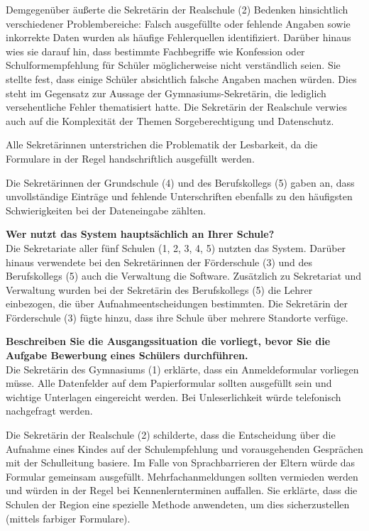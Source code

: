 Demgegenüber äußerte die Sekretärin der Realschule (2) Bedenken hinsichtlich verschiedener Problembereiche: Falsch ausgefüllte oder fehlende Angaben sowie inkorrekte Daten wurden als häufige Fehlerquellen identifiziert. Darüber hinaus wies sie darauf hin, dass bestimmte Fachbegriffe wie \glqq Konfession\grqq{} oder \glqq Schulformempfehlung\grqq{} für Schüler möglicherweise nicht verständlich seien. Sie stellte fest, dass einige Schüler absichtlich falsche Angaben machen würden. Dies steht im Gegensatz zur Aussage der Gymnasiums-Sekretärin, die lediglich versehentliche Fehler thematisiert hatte. Die Sekretärin der Realschule verwies auch auf die Komplexität der Themen Sorgeberechtigung und Datenschutz.

Alle Sekretärinnen unterstrichen die Problematik der Lesbarkeit, da die Formulare in der Regel handschriftlich ausgefüllt werden.

Die Sekretärinnen der Grundschule (4) und des Berufskollegs (5) gaben an, dass unvollständige Einträge und fehlende Unterschriften ebenfalls zu den häufigsten Schwierigkeiten bei der Dateneingabe zählten.


\textbf{Wer nutzt das System hauptsächlich an Ihrer Schule?}\\
Die Sekretariate aller fünf Schulen (1, 2, 3, 4, 5) nutzten das System. Darüber hinaus verwendete bei den Sekretärinnen der Förderschule (3) und des Berufskollegs (5) auch die Verwaltung die Software. Zusätzlich zu Sekretariat und Verwaltung wurden bei der Sekretärin des Berufskollegs (5) die Lehrer einbezogen, die über Aufnahmeentscheidungen bestimmten. Die Sekretärin der Förderschule (3) fügte hinzu, dass ihre Schule über mehrere Standorte verfüge.


\textbf{Beschreiben Sie die Ausgangssituation die vorliegt, bevor Sie die Aufgabe \glqq Bewerbung eines Schülers\grqq{} durchführen.}\\
Die Sekretärin des Gymnasiums (1) erklärte, dass ein Anmeldeformular vorliegen müsse. Alle Datenfelder auf dem Papierformular sollten ausgefüllt sein und wichtige Unterlagen eingereicht werden. Bei Unleserlichkeit würde telefonisch nachgefragt werden.

Die Sekretärin der Realschule (2) schilderte, dass die Entscheidung über die Aufnahme eines Kindes auf der Schulempfehlung und vorausgehenden Gesprächen mit der Schulleitung basiere. Im Falle von Sprachbarrieren der Eltern würde das Formular gemeinsam ausgefüllt. Mehrfachanmeldungen sollten vermieden werden und würden in der Regel bei Kennenlernterminen auffallen. Sie erklärte, dass die Schulen der Region eine spezielle Methode anwendeten, um dies sicherzustellen (mittels farbiger Formulare).

